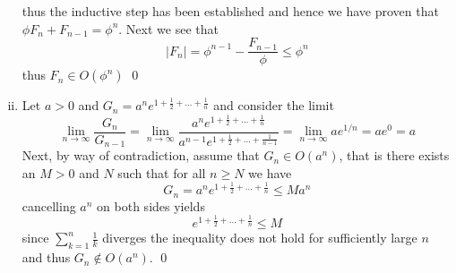 \documentclass[12pt]{report}
\begin{document}
\begin{enumerate}[(i)]
thus the inductive step has been established and hence we have proven that $\phi F_n + F_{n-1} = \phi^n$. Next we see that
\begin{equation*}
    |F_n| = \phi^{n-1} - \frac{F_{n-1}}{\phi} \leq \phi^n
\end{equation*}
thus $F_n \in O(\phi^n)$ \qed
\item Let $a > 0$ and $G_n = a^ne^{1 + \frac{1}{2} + \dots + \frac{1}{n}}$ and consider the limit
\begin{equation*}
    \lim_{n \to \infty} \frac{G_{n}}{G_{n-1}} = \lim_{n \to \infty} \frac{ a^ne^{1 + \frac{1}{2} + \dots + \frac{1}{n}}}{ a^{n-1}e^{1 + \frac{1}{2} + \dots + \frac{1}{n-1}}} = \lim_{n \to \infty} ae^{1/n} = ae^0 = a 
\end{equation*}
Next, by way of contradiction, assume that $G_n \in O(a^n)$, that is there exists an $M > 0$ and $N$ such that for all $n \geq N$ we have
\begin{equation*}
    G_n =  a^ne^{1 + \frac{1}{2} + \dots + \frac{1}{n}}\leq Ma^n
\end{equation*}
cancelling $a^n$ on both sides yields 
\begin{equation*}
    e^{1 + \frac{1}{2} + \dots + \frac{1}{n}}\leq M
\end{equation*}
since $\sum_{k=1}^n \frac{1}{k}$ diverges the inequality does not hold for sufficiently large $n$ and thus $G_n \not\in O(a^n)$. \qed
\end{enumerate}
\end{document}
